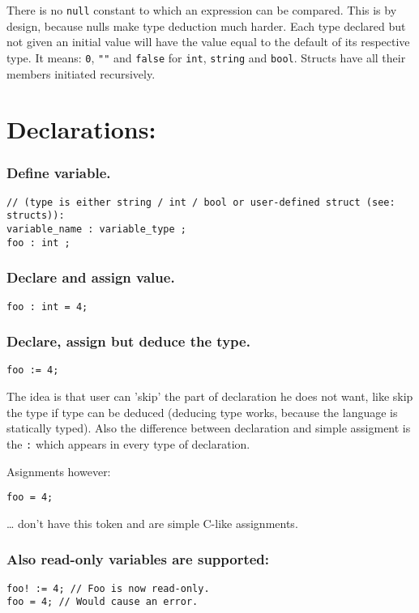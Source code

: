 \documentclass[11pt]{article}
\begin{document}
There is no \texttt{null} constant to which an expression can be
compared. This is by design, because nulls make type deduction much
harder. Each type declared but not given an initial value will have the value
equal to the default of its respective type. It means: \texttt{0}, \texttt{""}
and \texttt{false} for \texttt{int}, \texttt{string} and
\texttt{bool}. Structs have all their members initiated recursively.

\section*{Declarations:}
\label{sec:org8a897dc}

\subsubsection*{Define variable.}
\label{sec:orga97ab57}
\begin{verbatim}
// (type is either string / int / bool or user-defined struct (see: structs)):
variable_name : variable_type ;
foo : int ;
\end{verbatim}

\subsubsection*{Declare and assign value.}
\label{sec:orga5517d0}
\begin{verbatim}
foo : int = 4;
\end{verbatim}

\subsubsection*{Declare, assign but deduce the type.}
\label{sec:org6f0345f}
\begin{verbatim}
foo := 4;
\end{verbatim}

The idea is that user can 'skip' the part of declaration he does not want, like
skip the type if type can be deduced (deducing type works, because the language
is statically typed). Also the difference between declaration and simple
assigment is the \texttt{:} which appears in every type of declaration.

Asignments however:
\begin{verbatim}
foo = 4;
\end{verbatim}
\ldots{} don't have this token and are simple C-like assignments.

\subsubsection*{Also read-only variables are supported:}
\label{sec:org6d1edb9}
\begin{verbatim}
foo! := 4; // Foo is now read-only.
foo = 4; // Would cause an error.
\end{verbatim}
\end{document}
